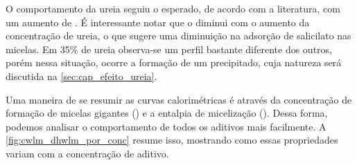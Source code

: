			O comportamento da ureia seguiu o esperado, de acordo com a literatura\cite{Souza2012, Bruning1961}, com um aumento de \cwlm{}. É interessante notar que o \DHwlm{} diminui com o aumento da concentração de ureia, o que sugere uma diminuição na adsorção de salicilato nas micelas. Em 35\% de ureia observa-se um perfil bastante diferente dos outros, porém nessa situação, ocorre a formação de um precipitado, cuja natureza será discutida na \autoref{sec:cap_efeito_ureia}.
			
			Uma maneira de se resumir as curvas calorimétricas é através da concentração de formação de micelas gigantes (\cwlm) e a entalpia de micelização (\DHwlm). Dessa forma, podemos analisar o comportamento de todos os aditivos mais facilmente. A \autoref{fig:cwlm_dhwlm_por_conc} resume isso, mostrando como essas propriedades variam com a concentração de aditivo.
			
		
